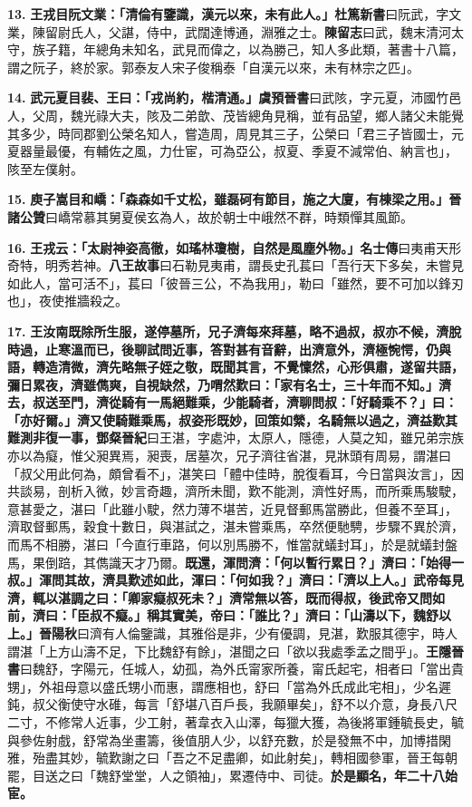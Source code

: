 \textbf{13.} \textbf{王戎目阮文業：「清倫有鑒識，漢元以來，未有此人。」}{\footnotesize \textbf{杜篤新書}曰阮武，字文業，陳留尉氏人，父諶，侍中，武闊達博通，淵雅之士。\textbf{陳留志}曰武，魏末清河太守，族子籍，年總角未知名，武見而偉之，以為勝己，知人多此類，著書十八篇，謂之阮子，終於家。郭泰友人宋子俊稱泰「自漢元以來，未有林宗之匹」。}

\textbf{14.} \textbf{武元夏目裴、王曰：「戎尚約，楷清通。」}{\footnotesize \textbf{虞預晉書}曰武陔，字元夏，沛國竹邑人，父周，魏光祿大夫，陔及二弟歆、茂皆總角見稱，並有品望，鄉人諸父未能覺其多少，時同郡劉公榮名知人，嘗造周，周見其三子，公榮曰「君三子皆國士，元夏器量最優，有輔佐之風，力仕宦，可為亞公，叔夏、季夏不減常伯、納言也」，陔至左僕射。}

\textbf{15.} \textbf{庾子嵩目和嶠：「森森如千丈松，雖磊砢有節目，施之大廈，有棟梁之用。」}{\footnotesize \textbf{晉諸公贊}曰嶠常慕其舅夏侯玄為人，故於朝士中峨然不群，時類憚其風節。}

\textbf{16.} \textbf{王戎云：「太尉神姿高徹，如瑤林瓊樹，自然是風塵外物。」}{\footnotesize \textbf{名士傳}曰夷甫天形奇特，明秀若神。\textbf{八王故事}曰石勒見夷甫，謂長史孔萇曰「吾行天下多矣，未嘗見如此人，當可活不」，萇曰「彼晉三公，不為我用」，勒曰「雖然，要不可加以鋒刃也」，夜使推牆殺之。}

\textbf{17.} \textbf{王汝南既除所生服，遂停墓所，兄子濟每來拜墓，略不過叔，叔亦不候，濟脫時過，止寒溫而已，後聊試問近事，答對甚有音辭，出濟意外，濟極惋愕，仍與語，轉造清微，濟先略無子姪之敬，既聞其言，不覺懍然，心形俱肅，遂留共語，彌日累夜，濟雖儁爽，自視缺然，乃喟然歎曰：「家有名士，三十年而不知。」濟去，叔送至門，濟從騎有一馬絕難乘，少能騎者，濟聊問叔：「好騎乘不？」曰：「亦好爾。」濟又使騎難乘馬，叔姿形既妙，回策如縈，名騎無以過之，濟益歎其難測非復一事，}{\footnotesize \textbf{鄧粲晉紀}曰王湛，字處沖，太原人，隱德，人莫之知，雖兄弟宗族亦以為癡，惟父昶異焉，昶喪，居墓次，兄子濟往省湛，見牀頭有周易，謂湛曰「叔父用此何為，頗曾看不」，湛笑曰「體中佳時，脫復看耳，今日當與汝言」，因共談易，剖析入微，妙言奇趣，濟所未聞，歎不能測，濟性好馬，而所乘馬駿駛，意甚愛之，湛曰「此雖小駛，然力薄不堪苦，近見督郵馬當勝此，但養不至耳」，濟取督郵馬，穀食十數日，與湛試之，湛未嘗乘馬，卒然便馳騁，步驟不異於濟，而馬不相勝，湛曰「今直行車路，何以別馬勝不，惟當就蟻封耳」，於是就蟻封盤馬，果倒踣，其儁識天才乃爾。}\textbf{既還，渾問濟：「何以暫行累日？」濟曰：「始得一叔。」渾問其故，濟具歎述如此，渾曰：「何如我？」濟曰：「濟以上人。」武帝每見濟，輒以湛調之曰：「卿家癡叔死未？」濟常無以答，既而得叔，後武帝又問如前，濟曰：「臣叔不癡。」稱其實美，帝曰：「誰比？」濟曰：「山濤以下，魏舒以上。」}{\footnotesize \textbf{晉陽秋}曰濟有人倫鑒識，其雅俗是非，少有優調，見湛，歎服其德宇，時人謂湛「上方山濤不足，下比魏舒有餘」，湛聞之曰「欲以我處季孟之間乎」。\textbf{王隱晉書}曰魏舒，字陽元，任城人，幼孤，為外氏甯家所養，甯氏起宅，相者曰「當出貴甥」，外祖母意以盛氏甥小而惠，謂應相也，舒曰「當為外氏成此宅相」，少名遲鈍，叔父衡使守水碓，每言「舒堪八百戶長，我願畢矣」，舒不以介意，身長八尺二寸，不修常人近事，少工射，著韋衣入山澤，每獵大獲，為後將軍鍾毓長史，毓與參佐射戲，舒常為坐畫籌，後值朋人少，以舒充數，於是發無不中，加博措閑雅，殆盡其妙，毓歎謝之曰「吾之不足盡卿，如此射矣」，轉相國參軍，晉王每朝罷，目送之曰「魏舒堂堂，人之領袖」，累遷侍中、司徒。}\textbf{於是顯名，年二十八始宦。}

